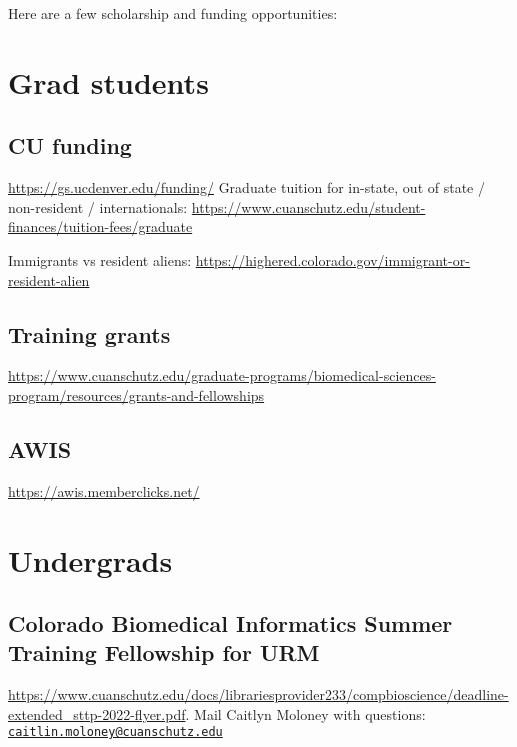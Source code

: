 \documentclass[
  letterpaper,
  DIV=11,
  numbers=noendperiod]{scrreprt}
\begin{document}
Here are a few scholarship and funding opportunities:

\hypertarget{grad-students}{%
\section{Grad students}\label{grad-students}}

\hypertarget{cu-funding}{%
\subsection{CU funding}\label{cu-funding}}

\url{https://gs.ucdenver.edu/funding/} Graduate tuition for in-state,
out of state / non-resident / internationals:
\url{https://www.cuanschutz.edu/student-finances/tuition-fees/graduate}

Immigrants vs resident aliens:
\url{https://highered.colorado.gov/immigrant-or-resident-alien}

\hypertarget{training-grants}{%
\subsection{Training grants}\label{training-grants}}

\url{https://www.cuanschutz.edu/graduate-programs/biomedical-sciences-program/resources/grants-and-fellowships}

\hypertarget{awis}{%
\subsection{AWIS}\label{awis}}

\url{https://awis.memberclicks.net/}

\hypertarget{undergrads}{%
\section{Undergrads}\label{undergrads}}

\hypertarget{colorado-biomedical-informatics-summer-training-fellowship-for-urm}{%
\subsection{Colorado Biomedical Informatics Summer Training Fellowship
for
URM}\label{colorado-biomedical-informatics-summer-training-fellowship-for-urm}}

\url{https://www.cuanschutz.edu/docs/librariesprovider233/compbioscience/deadline-extended_sttp-2022-flyer.pdf}.
Mail Caitlyn Moloney with questions:
\href{mailto:caitlin.moloney@cuanschutz.edu}{\nolinkurl{caitlin.moloney@cuanschutz.edu}}
\end{document}
